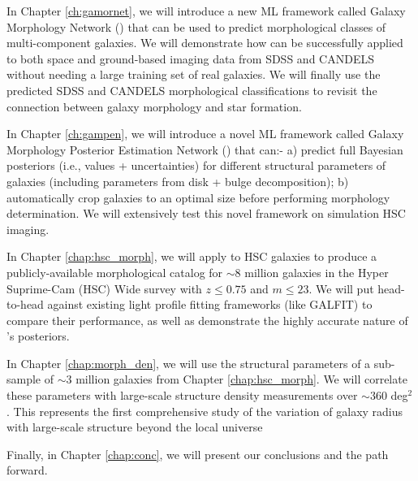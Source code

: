 In Chapter \ref{ch:gamornet}, we will introduce a new ML framework called Galaxy Morphology Network (\gamornet) that can be used to predict morphological classes of multi-component galaxies. We will demonstrate how \gamornet{} can be successfully applied to both space and ground-based imaging data from SDSS and CANDELS without needing a large training set of real galaxies. We will finally use the predicted SDSS and CANDELS morphological classifications to revisit the connection between galaxy morphology and star formation.

In Chapter \ref{ch:gampen}, we will introduce a novel ML framework called Galaxy Morphology Posterior Estimation Network (\gampen{}) that can:- a) predict full Bayesian posteriors (i.e., values + uncertainties) for different structural parameters of galaxies (including parameters from disk + bulge decomposition); b) automatically crop galaxies to an optimal size before performing morphology determination. We will extensively test this novel framework on simulation HSC imaging.

In Chapter \ref{chap:hsc_morph}, we will apply \gampen{} to HSC galaxies to produce a publicly-available morphological catalog for $\sim 8$ million galaxies in the Hyper Suprime-Cam (HSC) Wide survey with $z \leq 0.75$ and $m \leq 23$. We will put \gampen{} head-to-head against existing light profile fitting frameworks (like GALFIT) to compare their performance, as well as demonstrate the highly accurate nature of \gampen{}'s posteriors.

In Chapter \ref{chap:morph_den}, we will use the structural parameters of a sub-sample of $\sim3$ million galaxies from Chapter \ref{chap:hsc_morph}. We will correlate these parameters with large-scale structure density measurements over $\sim360$ deg$^2$. This represents the first comprehensive study of the variation of galaxy radius with large-scale structure beyond the local universe

Finally, in Chapter \ref{chap:conc}, we will present our conclusions and the path forward. 